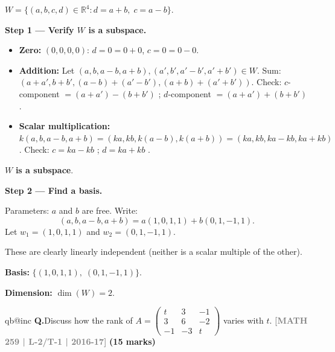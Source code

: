 \documentclass[12pt,a3paper]{article}
\makeatletter
\newcommand{\yr}[1]{\hfill\textcolor{gray}{\small\textbf{[#1]}}}
\newcommand{\mk}[1]{\textcolor{orange!70!black}{\small\textbf{(#1 marks)}}}
\newcounter{qnum}
\newcommand{\Q}[1]{%
  \csname qb@inc\endcsname
  \needspace{4\baselineskip}
  \refstepcounter{qnum}
  \vspace{6pt}
  \noindent\textbf{Q\theqnum.}\enspace #1\par
}
\makeatother
\begin{document}
\begin{tcolorbox}[enhanced,breakable,colback=cC!4,colframe=cC,
  boxrule=0.8pt,arc=5pt,
  title={\textbf{Answer}},
  fonttitle=\bfseries\color{white},colbacktitle=cC]

$W=\{(a,b,c,d)\in\mathbb{R}^4 : d=a+b,\;c=a-b\}$.

\textbf{Step 1 --- Verify $W$ is a subspace.}

\begin{itemize}[itemsep=2pt]
  \item \textbf{Zero:} $(0,0,0,0)$: $d=0=0+0$, $c=0=0-0$. \checkmark
  \item \textbf{Addition:} Let $(a,b,a-b,a+b),(a',b',a'-b',a'+b')\in W$. Sum: $(a+a',b+b',(a-b)+(a'-b'),(a+b)+(a'+b'))$. Check: $c$-component $=(a+a')-(b+b')$ \checkmark; $d$-component $=(a+a')+(b+b')$ \checkmark.
  \item \textbf{Scalar multiplication:} $k(a,b,a-b,a+b)=(ka,kb,k(a-b),k(a+b))=(ka,kb,ka-kb,ka+kb)$. Check: $c=ka-kb$ \checkmark; $d=ka+kb$ \checkmark.
\end{itemize}
$W$ \textbf{is a subspace}.

\medskip
\textbf{Step 2 --- Find a basis.}

Parameters: $a$ and $b$ are free. Write:
\[
(a,b,a-b,a+b) = a(1,0,1,1)+b(0,1,-1,1).
\]
Let $w_1=(1,0,1,1)$ and $w_2=(0,1,-1,1)$.

These are clearly linearly independent (neither is a scalar multiple of the other).

\textbf{Basis:} $\{(1,0,1,1),\;(0,1,-1,1)\}$.

\textbf{Dimension:} $\dim(W)=2$.
\end{tcolorbox}

\Q{Discuss how the rank of $A = \begin{pmatrix} t & 3 & -1 \\ 3 & 6 & -2 \\ -1 & -3 & t \end{pmatrix}$ varies with $t$.
\yr{MATH 259 | L-2/T-1 | 2016-17} \mk{15}}
\end{document}
